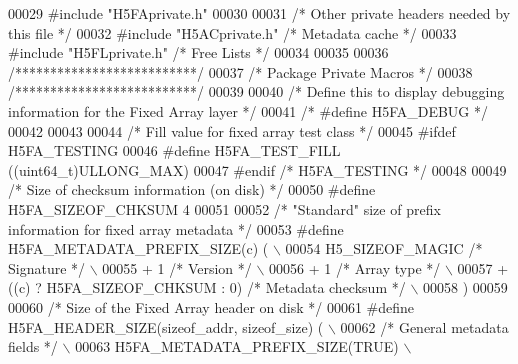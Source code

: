 \begin{DoxyCode}
00029 \textcolor{preprocessor}{#include "H5FAprivate.h"}
00030 
00031 \textcolor{comment}{/* Other private headers needed by this file */}
00032 \textcolor{preprocessor}{#include "H5ACprivate.h"}    \textcolor{comment}{/* Metadata cache                       */}
00033 \textcolor{preprocessor}{#include "H5FLprivate.h"}    \textcolor{comment}{/* Free Lists                           */}
00034 
00035 
00036 \textcolor{comment}{/**************************/}
00037 \textcolor{comment}{/* Package Private Macros */}
00038 \textcolor{comment}{/**************************/}
00039 
00040 \textcolor{comment}{/* Define this to display debugging information for the Fixed Array layer */}
00041 \textcolor{comment}{/* #define H5FA\_DEBUG */}
00042 
00043 
00044 \textcolor{comment}{/* Fill value for fixed array test class */}
00045 \textcolor{preprocessor}{#ifdef H5FA\_TESTING}
00046 \textcolor{preprocessor}{#define H5FA\_TEST\_FILL          ((uint64\_t)ULLONG\_MAX)}
00047 \textcolor{preprocessor}{#endif }\textcolor{comment}{/* H5FA\_TESTING */}\textcolor{preprocessor}{}
00048 
00049 \textcolor{comment}{/* Size of checksum information (on disk) */}
00050 \textcolor{preprocessor}{#define H5FA\_SIZEOF\_CHKSUM      4}
00051 
00052 \textcolor{comment}{/* "Standard" size of prefix information for fixed array metadata */}
00053 \textcolor{preprocessor}{#define H5FA\_METADATA\_PREFIX\_SIZE(c) (                                      \(\backslash\)}
00054 \textcolor{preprocessor}{    H5\_SIZEOF\_MAGIC                     }\textcolor{comment}{/* Signature            */}\textcolor{preprocessor}{          \(\backslash\)}
00055 \textcolor{preprocessor}{    + 1                                 }\textcolor{comment}{/* Version              */}\textcolor{preprocessor}{          \(\backslash\)}
00056 \textcolor{preprocessor}{    + 1                                 }\textcolor{comment}{/* Array type           */}\textcolor{preprocessor}{          \(\backslash\)}
00057 \textcolor{preprocessor}{    + ((c) ? H5FA\_SIZEOF\_CHKSUM : 0)    }\textcolor{comment}{/* Metadata checksum    */}\textcolor{preprocessor}{          \(\backslash\)}
00058 \textcolor{preprocessor}{    )}
00059 
00060 \textcolor{comment}{/* Size of the Fixed Array header on disk */}
00061 \textcolor{preprocessor}{#define H5FA\_HEADER\_SIZE(sizeof\_addr, sizeof\_size) (                          \(\backslash\)}
00062 \textcolor{preprocessor}{    }\textcolor{comment}{/* General metadata fields */}\textcolor{preprocessor}{                                             \(\backslash\)}
00063 \textcolor{preprocessor}{    H5FA\_METADATA\_PREFIX\_SIZE(TRUE)                                           \(\backslash\)}

\end{DoxyCode}
